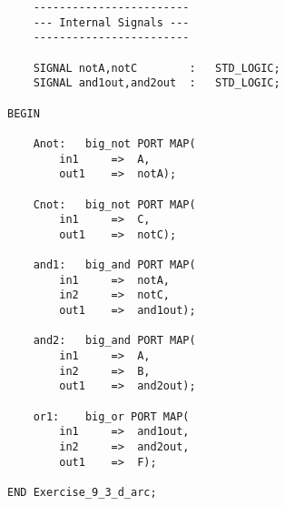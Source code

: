 \begin{enumerate}
\begin{lstlisting}
	------------------------
	--- Internal Signals ---
	------------------------

	SIGNAL notA,notC		:	STD_LOGIC;
	SIGNAL and1out,and2out	:	STD_LOGIC;

BEGIN

	Anot:	big_not PORT MAP(
		in1		=>	A,
		out1	=>	notA);

	Cnot:	big_not PORT MAP(
		in1		=>	C,
		out1	=>	notC);

	and1:	big_and PORT MAP(
		in1		=>	notA,
		in2		=>	notC,
		out1	=>	and1out);

	and2:	big_and PORT MAP(
		in1		=>	A,
		in2		=>	B,
		out1	=>	and2out);

	or1:	big_or PORT MAP(
		in1		=>	and1out,
		in2		=>	and2out,
		out1	=>	F);

END Exercise_9_3_d_arc;
\end{lstlisting}
\end{enumerate}

